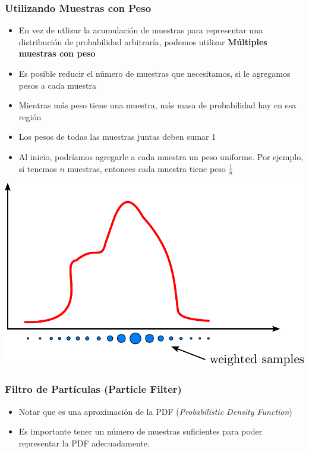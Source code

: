 \begin{frame}
    \frametitle{Utilizando Muestras con Peso}
    \footnotesize
    \begin{itemize}
        \item En vez de utlizar la acumulación de muestras para representar una distribución de probabilidad arbitraría, podemos utilizar \textbf{Múltiples muestras con peso} 
        \item Es posible reducir el número de muestras que necesitamos, si le agregamos pesos a cada muestra
        \item Mientras más peso tiene una muestra, más masa de probabilidad hay en esa región
        \item Los pesos de todas las muestras juntas deben sumar 1
        \item Al inicio, podríamos agregarle a cada muestra un peso uniforme. Por ejemplo, si tenemos $n$ muestras, entonces cada muestra tiene peso $\frac{1}{n}$
    \end{itemize}
    
    \begin{center}
        \includegraphics[width=0.5\columnwidth]{./images/particle_filter/arbitrary_distribution_weighted_samples.pdf}
    \end{center}
    
\end{frame}

\begin{frame}
    \frametitle{Filtro de Partículas (Particle Filter)}
    
    \footnotesize
    \begin{itemize}
        \item Notar que es una aproximación de la PDF (\emph{Probabilistic Density Function})
        \item Es importante tener un número de muestras suficientes para poder representar la PDF adecuadamente.
    \end{itemize}
    
    
\end{frame}

